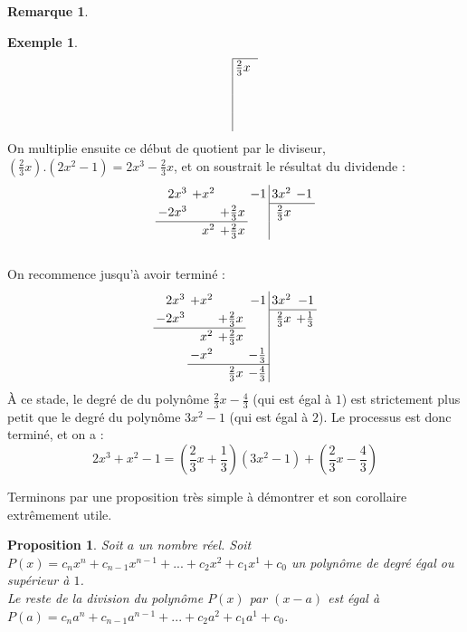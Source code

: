 \documentclass[a4paper,13pt]{scrreprt}
\theoremstyle{plain}
\newtheorem{pro}[subsection]{Proposition}
\theoremstyle{definition}
\newtheorem{exe}[subsection]{Exemple}
\newtheorem{rema}[subsection]{Remarque}
\begin{document}
\begin{rema}
\begin{itemize}
\begin{exe}
\begin{equation*}
\begin{array}{rrrr|rr}
			\cline{5-6}
			&    &   &  &\frac{2}{3}x&   \\
			&  & &  &   &  \\
			&  &   &   &   &  \\
			&     &   &   &   &  
			\end{array}
			\end{equation*}
			On multiplie ensuite ce début de quotient par le diviseur, $(\frac{2}{3}x).(2x^2 -1) = 2x^3 - \frac{2}{3}x$, et on soustrait le résultat du dividende :
			\begin{equation*}
			\renewcommand{\arraystretch}{1.2}
			\renewcommand{\arraycolsep}{2pt}
			\begin{array}{rrrr|rr}
			2x^3&+x^2 &   &-1&3x^2  &-1  \\
			\cline{5-6}
			-2x^3&    &+\frac{2}{3}x&  &\frac{2}{3}x&   \\
			\cline{1-3}
			&x^2 &+\frac{2}{3}x&  &   &  
			\end{array}
			\end{equation*}
			~~\\
			On recommence jusqu'à avoir terminé :
			\begin{equation*}
			\renewcommand{\arraystretch}{1.2}
			\renewcommand{\arraycolsep}{2pt}
			\begin{array}{rrrr|rr}
			2x^3&+x^2 &   &-1&3x^2  &-1  \\
			\cline{5-6}
			-2x^3&    &+\frac{2}{3}x&  &\frac{2}{3}x&+\frac{1}{3}\\
			\cline{1-3}
			&x^2 &+\frac{2}{3}x&  &   &  \\
			&-x^2&   &-\frac{1}{3}&   &  \\
			\cline{2-4}
			&     &\frac{2}{3}x&-\frac{4}{3}&   &  
			\end{array}
			\end{equation*}
			À ce stade, le degré de du polynôme $\frac{2}{3}x-\frac{4}{3}$ (qui est égal à $1$) est strictement plus petit que le degré du polynôme $3x^2-1$ (qui est égal à $2$). Le processus est donc terminé, et on a :
			$$2x^3+x^2-1 = \left(\frac{2}{3}x+\frac{1}{3}\right)\left(3x^2-1\right) + \left(\frac{2}{3}x-\frac{4}{3}\right)$$
		\end{exe}
	\end{itemize}
\end{rema}
Terminons par une proposition très simple à démontrer et son corollaire extrêmement utile.
\begin{pro}
	Soit $a$ un nombre réel. Soit $P(x)=c_n x^n + c_{n-1} x^{n-1} + ... + c_2 x^2 + c_1 x^1 + c_0$ un polynôme de degré égal ou supérieur à $1$. \\
	Le reste de la division du polynôme $P(x)$ par $(x-a)$ est égal à $P(a) = c_n a^n + c_{n-1} a^{n-1} + ... + c_2 a^2 + c_1 a^1 + c_0$.
\end{pro}
\end{document}
